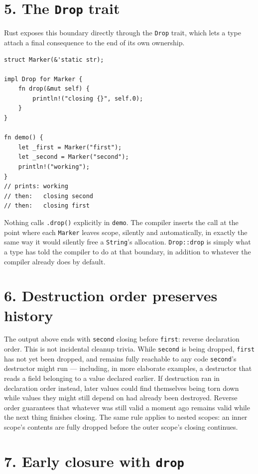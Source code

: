 \documentclass[11pt]{book}
\begin{document}
\section*{5. The \texttt{Drop} trait}

Rust exposes this boundary directly through the \texttt{Drop} trait, which lets a type attach a final consequence to the end of its own ownership.

\begin{lstlisting}
struct Marker(&'static str);

impl Drop for Marker {
    fn drop(&mut self) {
        println!("closing {}", self.0);
    }
}

fn demo() {
    let _first = Marker("first");
    let _second = Marker("second");
    println!("working");
}
// prints: working
// then:   closing second
// then:   closing first
\end{lstlisting}

Nothing calls \texttt{.drop()} explicitly in \texttt{demo}. The compiler inserts the call at the point where each \texttt{Marker} leaves scope, silently and automatically, in exactly the same way it would silently free a \texttt{String}'s allocation. \texttt{Drop::drop} is simply what a type has told the compiler to do at that boundary, in addition to whatever the compiler already does by default.

\section*{6. Destruction order preserves history}

The output above ends with \texttt{second} closing before \texttt{first}: reverse declaration order. This is not incidental cleanup trivia. While \texttt{second} is being dropped, \texttt{first} has not yet been dropped, and remains fully reachable to any code \texttt{second}'s destructor might run --- including, in more elaborate examples, a destructor that reads a field belonging to a value declared earlier. If destruction ran in declaration order instead, later values could find themselves being torn down while values they might still depend on had already been destroyed. Reverse order guarantees that whatever was still valid a moment ago remains valid while the next thing finishes closing. The same rule applies to nested scopes: an inner scope's contents are fully dropped before the outer scope's closing continues.

\section*{7. Early closure with \texttt{drop}}
\end{document}
